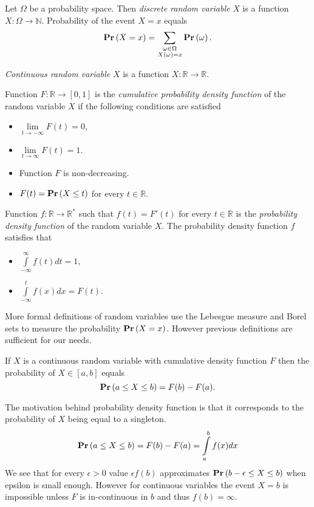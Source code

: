 \begin{definition}
Let $\Omega$ be a probability space. Then \emph{discrete random variable} $X$ is a function $X: \Omega \rightarrow \mathbb{N}$. Probability of the event $X = x$ equals
\[
\mathbf{Pr}\left(X = x\right) = \displaystyle\sum_{\substack{\omega \in \Omega \\ X(\omega) = x}} \mathbf{Pr}\left(\omega\right) \text{.}
\]
\end{definition}

\begin{definition}
\emph{Continuous random variable} $X$ is a function $X: \mathbb{R} \rightarrow \mathbb{R}$. 

Function $F: \mathbb{R} \rightarrow \left[0, 1\right]$ is the \emph{cumulative probability density function} of the random variable $X$ if the following conditions are satisfied
\begin{itemize}
\item $\lim\limits_{t \rightarrow -\infty} F(t) = 0$,
\item $\lim\limits_{t \rightarrow \infty} F(t) = 1$.
\item Function $F$ is non-decreasing.
\item $F(t) = \mathbf{Pr}\left(X \leq t\right) $ for every $t \in \mathbb{R}$.
\end{itemize}

Function $f: \mathbb{R} \rightarrow \mathbb{R}^{*}$ such that $f(t) = F'(t)$ for every $t \in \mathbb{R}$ is the \emph{probability density function} of the random variable $X$. The probability density function $f$ satisfies that
\begin{itemize}
\item $\int\limits_{-\infty}^{\infty} f(t) dt = 1$,
\item $\int\limits_{-\infty}^{t} f(x) dx = F(t)$.
\end{itemize}
\end{definition}

More formal definitions of random variables use the Lebesgue measure and Borel sets to measure the probability $\mathbf{Pr}\left(X = x\right)$. However previous definitions are sufficient for our needs.

If $X$ is a continuous random variable with cumulative density function $F$ then the probability of $X \in \left[a, b\right]$ equals
\[
\mathbf{Pr}\left(a \leq X \leq b\right) = F(b) - F(a) \text{.}
\]

The motivation behind probability density function is that it corresponds to the probability of $X$ being equal to a singleton.
\[
\mathbf{Pr}\left(a \leq X \leq b\right) = F(b) - F(a) = \int\limits_{a}^{b} f(x) dx
\]
We see that for every $\epsilon > 0$ value $\epsilon f(b)$ approximates $\mathbf{Pr}\left(b - \epsilon \leq X \leq b\right)$ when epsilon is small enough. However for continuous variables the event $X = b$ is impossible unless $F$ is in-continuous in $b$ and thus $f(b) = \infty$.	

